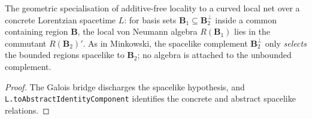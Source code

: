 \begin{theorem}
    \label{thrm:additive-free-locality-in-curved-spacetime}
    \leanok
    The geometric specialisation of additive-free locality to a curved local net over a concrete Lorentzian spacetime $L$: for basis sets $\mathbf{B}_1 \subseteq \mathbf{B}_2^\perp$ inside a common containing region $\mathbf{B}$, the local von Neumann algebra $R(\mathbf{B}_1)$ lies in the commutant $R(\mathbf{B}_2)'$. As in Minkowski, the spacelike complement $\mathbf{B}_2^\perp$ only \emph{selects} the bounded regions spacelike to $\mathbf{B}_2$; no algebra is attached to the unbounded complement.
\end{theorem}
\begin{proof}
    \leanok
    The Galois bridge discharges the spacelike hypothesis, and \texttt{L.toAbstractIdentityComponent} identifies the concrete and abstract spacelike relations.
\end{proof}

